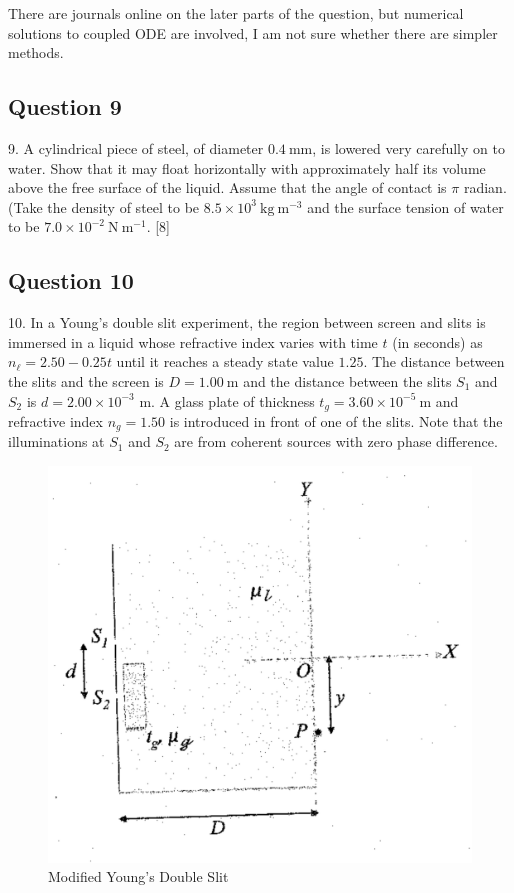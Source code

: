 \documentclass{article}
\begin{document}
There are journals online on the later parts of the question, but numerical solutions to coupled ODE are involved, I am not sure whether there are simpler methods.\\

\subsection{Question 9}
9. A cylindrical piece of steel, of diameter $0.4 \mathrm{~mm}$, is lowered very carefully on to water. Show that it may float horizontally with approximately half its volume above the free surface of the liquid. Assume that the angle of contact is $\pi$ radian. (Take the density of steel to be $8.5 \times 10^{3} \mathrm{~kg} \mathrm{~m}^{-3}$ and the surface tension of water to be $7.0 \times 10^{-2} \mathrm{~N} \mathrm{~m}^{-1}$. [8]

\subsection{Question 10}
10. In a Young's double slit experiment, the region between screen and slits is immersed in a liquid whose refractive index varies with time $t$ (in seconds) as $n_{\ell}=2.50 - 0.25 t$ until it reaches a steady state value $1.25$. The distance between the slits and the screen is $D=1.00 \mathrm{~m}$ and the distance between the slits $S_{1}$ and $S_{2}$ is $d=2.00 \times 10^{-3}$ m. A glass plate of thickness $t_{g}=3.60 \times 10^{-5} \mathrm{~m}$ and refractive index $n_{g}=1.50$ is introduced in front of one of the slits. Note that the illuminations at $S_{1}$ and $S_{2}$ are from coherent sources with zero phase difference.

\begin{figure}
	\centering
	\includegraphics[width=0.5\linewidth]{spho_book_TYS_images/2012q10.png}
	\caption{Modified Young's Double Slit}
\end{figure}
\end{document}

